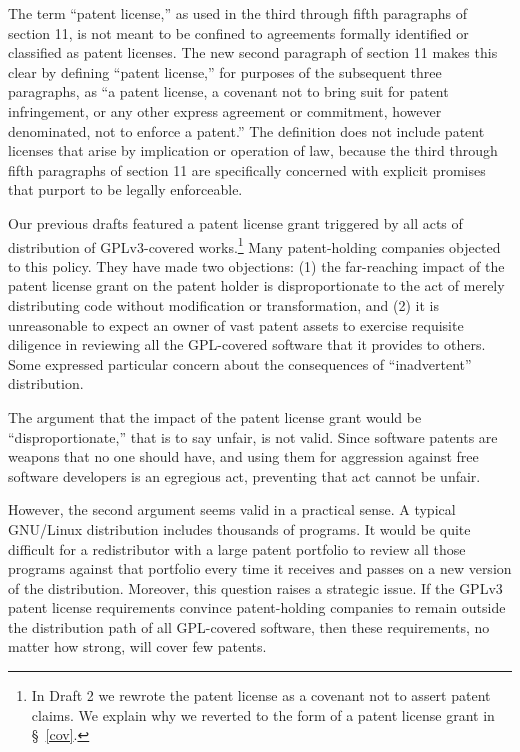 The term ``patent license,'' as used in the third through fifth
paragraphs of section 11, is not meant to be confined to agreements
formally identified or classified as patent licenses.  The new second
paragraph of section 11 makes this clear by defining ``patent license,''
for purposes of the subsequent three paragraphs, as ``a patent license,
a covenant not to bring suit for patent infringement, or any other
express agreement or commitment, however denominated, not to enforce a
patent.''  The definition does not include patent licenses that arise by
implication or operation of law, because the third through fifth
paragraphs of section 11 are specifically concerned with explicit
promises that purport to be legally enforceable.

Our previous drafts featured a patent license grant triggered by all
acts of distribution of GPLv3-covered works.\footnote{In Draft 2 we
rewrote the patent license as a covenant not to assert patent claims. We
explain why we reverted to the form of a patent license grant in \S\
\ref{cov}.} Many patent-holding companies objected to this policy. They
have made two objections: (1) the far-reaching impact of the patent
license grant on the patent holder is disproportionate to the act of
merely distributing code without modification or transformation, and (2)
it is unreasonable to expect an owner of vast patent assets to exercise
requisite diligence in reviewing all the GPL-covered software that it
provides to others.  Some expressed particular concern about the
consequences of ``inadvertent'' distribution.

The argument that the impact of the patent license grant would be
``disproportionate,'' that is to say unfair, is not valid. Since
software patents are weapons that no one should have, and using them for
aggression against free software developers is an egregious act,
preventing that act cannot be unfair. 

However, the second argument seems valid in a practical sense.  A
typical GNU/Linux distribution includes thousands of programs. It would
be quite difficult for a redistributor with a large patent portfolio to
review all those programs against that portfolio every time it receives
and passes on a new version of the distribution. Moreover, this question
raises a strategic issue. If the GPLv3 patent license requirements
convince patent-holding companies to remain outside the distribution
path of all GPL-covered software, then these requirements, no matter how
strong, will cover few patents. 

